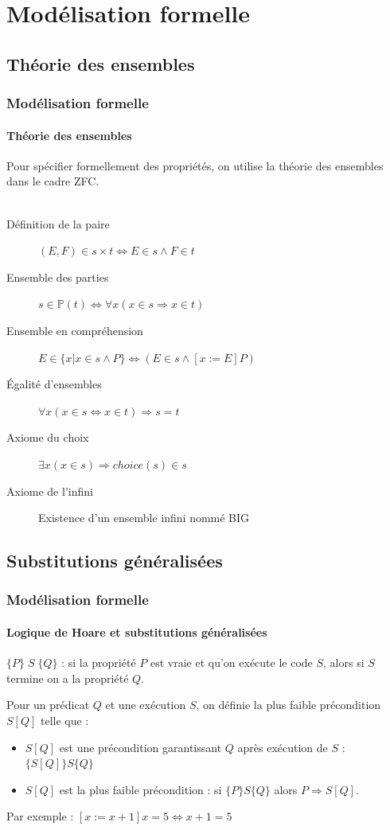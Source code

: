\documentclass[11pt,a4paper,xcolor=table]{beamer} %
\begin{document}
%
%
\frame{\tableofcontents}

\section{Modélisation formelle}
\subsection{Théorie des ensembles}
\begin{frame}
\frametitle{Modélisation formelle}
\framesubtitle{Théorie des ensembles}
Pour spécifier formellement des propriétés, on utilise la théorie des ensembles dans le cadre ZFC.
\\~\pause
\begin{description}
\item[Définition de la paire] $(E, F) \in s \times t \Leftrightarrow E \in s \wedge F \in t$
\item[Ensemble des parties] $s \in \mathbb{P}(t) \Leftrightarrow \forall x (x \in s \Rightarrow x \in t)$
\item[Ensemble en compréhension] $E \in \{ x | x \in s \wedge P \} \Leftrightarrow (E \in s \wedge [x:= E] P)$
\item[Égalité d'ensembles] $\forall x (x \in s \Leftrightarrow x \in t) \Rightarrow s = t$
\item[Axiome du choix] $\exists x  (x \in s) \Rightarrow choice(s) \in s$
\item[Axiome de l'infini] Existence d'un ensemble infini nommé BIG
\end{description}
\end{frame}

\subsection{Substitutions généralisées}
\begin{frame}
\frametitle{Modélisation formelle}
\framesubtitle{Logique de Hoare et substitutions généralisées}
\begin{definition}
$ \{P\}\;S\;\{Q\} $ : si la propriété $P$ est vraie et qu'on exécute le code $S$, alors si $S$ termine on a la propriété $Q$.
\end{definition}
\pause
\begin{definition}
Pour un prédicat $Q$ et une exécution $S$, on définie la plus faible précondition $S[Q]$ telle que :
\begin{itemize}
\item $S[Q]$ est une précondition garantissant $Q$  après exécution de $S$ : $ \{ S[Q] \} S \{ Q\}$
\item $S[Q]$  est la plus faible précondition : si $\{ P \} S \{ Q \}$ alors $P \Rightarrow S[Q]$.
\end{itemize}
\end{definition}
Par exemple : $[x := x+1] x = 5 \Leftrightarrow x+1 = 5$
\end{frame}
\end{document}
